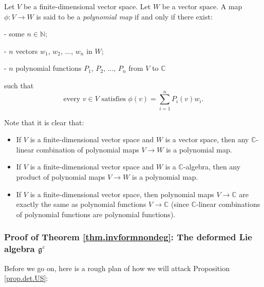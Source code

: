 \documentclass[etingof-lie.tex]{subfiles}
\begin{document}
\begin{definition}
\label{def.det.US.polymap}Let $V$ be a finite-dimensional vector space. Let
$W$ be a vector space. A map $\phi:V\rightarrow W$ is said to be a
\textit{polynomial map} if and only if there exist:

- some $n\in\mathbb{N}$;

- $n$ vectors $w_{1}$, $w_{2}$, $...$, $w_{n}$ in $W$;

- $n$ polynomial functions $P_{1}$, $P_{2}$, $...$, $P_{n}$ from $V$ to
$\mathbb{C}$

such that%
\[
\text{every }v\in V\text{ satisfies }\phi\left(  v\right)  =\sum
\limits_{i=1}^{n}P_{i}\left(  v\right)  w_{i}.
\]

\end{definition}

Note that it is clear that:

\begin{itemize}
\item If $V$ is a finite-dimensional vector space and $W$ is a vector space,
then any $\mathbb{C}$-linear combination of polynomial maps $V\rightarrow W$
is a polynomial map.

\item If $V$ is a finite-dimensional vector space and $W$ is a $\mathbb{C}%
$-algebra, then any product of polynomial maps $V\rightarrow W$ is a
polynomial map.

\item If $V$ is a finite-dimensional vector space, then polynomial maps
$V\rightarrow\mathbb{C}$ are exactly the same as polynomial functions
$V\rightarrow\mathbb{C}$ (since $\mathbb{C}$-linear combinations of polynomial
functions are polynomial functions).
\end{itemize}

\subsubsection{Proof of Theorem \ref{thm.invformnondeg}: The deformed Lie
algebra \texorpdfstring{$\mathfrak{g}^{\varepsilon}$}{g superscript epsilon}}

Before we go on, here is a rough plan of how we will attack Proposition
\ref{prop.det.US}:
\end{document}
